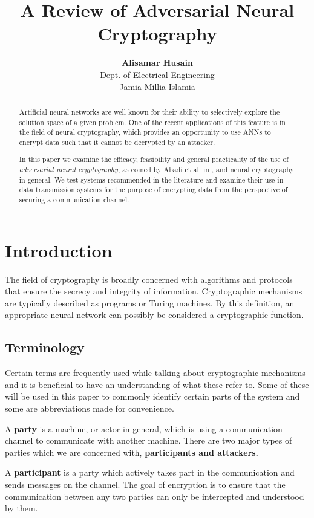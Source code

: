 \documentclass[a4paper]{article}
\date{}
\title{A Review of Adversarial Neural Cryptography}
\author{
  {\bf Alisamar Husain}\\
  Dept. of Electrical Engineering\\
  Jamia Millia Islamia
}
\begin{document}
  \maketitle

  \begin{abstract}
    Artificial neural networks are well known for their ability to selectively 
    explore the solution space of a given problem.
    One of the recent applications of this feature is in the field of neural 
    cryptography, which provides an opportunity to use ANNs to encrypt data 
    such that it cannot be decrypted by an attacker.

    In this paper we examine the efficacy, feasibility and 
    general practicality of the use of {\it adversarial neural cryptography}, 
    as coined by Abadi et al. in \cite{seminalanc}, and neural cryptography
    in general. We test systems recommended in the literature and examine their 
    use in data transmission systems for the purpose of encrypting data from
    the perspective of securing a communication channel.
  \end{abstract}
 
  \section{Introduction}
  The field of cryptography is broadly concerned with algorithms and protocols 
  that ensure the secrecy and integrity of information. Cryptographic mechanisms are 
  typically described as programs or Turing machines. By this definition, an
  appropriate neural network can possibly be considered a cryptographic function.

    \subsection{Terminology}
    Certain terms are frequently used while talking about cryptographic mechanisms
    and it is beneficial to have an understanding of what these refer to. Some
    of these will be used in this paper to commonly identify certain parts of the 
    system and some are abbreviations made for convenience.

    A {\bf party} is a machine, or actor in general, which is using a communication
    channel to communicate with another machine. There are two major types of parties
    which we are concerned with, {\bf participants and attackers.}
    
    A {\bf participant} is a party which actively takes part in the communication and
    sends messages on the channel. The goal of encryption is to ensure that the 
    communication between any two parties can only be intercepted and understood 
    by them.
\end{document}
